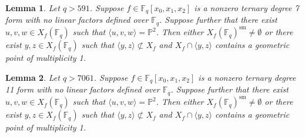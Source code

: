 \documentclass[10pt,a4paper]{amsart}
\newtheorem{lemma}{Lemma}
\newcommand{\F}{\mathbb{F}}
\renewcommand{\P}{\mathbb{P}}
\newcommand{\Span}[1]{\langle #1 \rangle}
\newcommand{\qbound}[1]{{\color{cyan}$q > {#1}$}}
\newcommand{\sm}{\mathrm{sm}}
\begin{document}
\begin{lemma}
\label{lem:plane_with_3pts}
    Let \qbound{591}. Suppose $f \in \F_q[x_0, x_1, x_2]$ is a nonzero ternary degree 7 form with no linear factors defined over $\F_q$. Suppose further that there exist $u,v,w \in X_f(\F_q)$ such that $\Span{u,v,w} = \P^2$. Then either $X_f(\F_q)^{\sm} \neq \emptyset$ or there exist $y,z \in X_f(\F_q)$ such that $\Span{y,z} \not\subset X_f$ and $X_f \cap \Span{y,z}$ contains a geometric point of multiplicity 1.
\end{lemma}

\begin{lemma}
\label{lem:plane_with_3pts_d=11}
    Let \qbound{7061}. Suppose $f \in \F_q[x_0, x_1, x_2]$ is a nonzero ternary degree 11 form with no linear factors defined over $\F_q$. Suppose further that there exist $u,v,w \in X_f(\F_q)$ such that $\Span{u,v,w} = \P^2$. Then either $X_f(\F_q)^{\sm} \neq \emptyset$ or there exist $y,z \in X_f(\F_q)$ such that $\Span{y,z} \not\subset X_f$ and $X_f \cap \Span{y,z}$ contains a geometric point of multiplicity 1.
\end{lemma}
\end{document}
